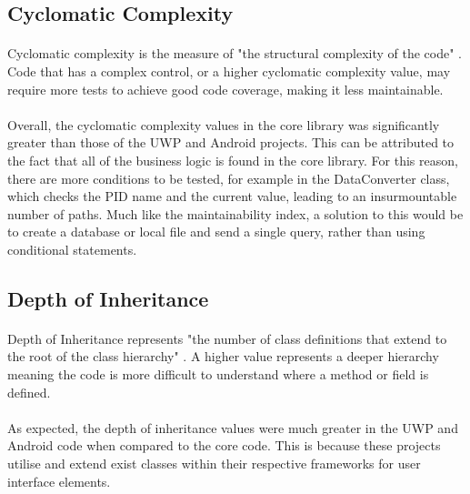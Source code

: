 {	\subsection*{Cyclomatic Complexity}
		\paragraph{}{
		Cyclomatic complexity is the measure of "the structural complexity of the code" \cite{CodeMetrics}. Code that has a complex control, or a higher cyclomatic complexity value, may require more tests to achieve good code coverage, making it less maintainable.
		}
		\paragraph{}{
		Overall, the cyclomatic complexity values in the core library was significantly greater than those of the UWP and Android projects. This can be attributed to the fact that all of the business logic is found in the core library. For this reason, there are more conditions to be tested, for example in the DataConverter class, which checks the PID name and the current value, leading to an insurmountable number of paths. Much like the maintainability index, a solution to this would be to create a database or local file and send a single query, rather than using conditional statements.
		}
	
	\subsection*{Depth of Inheritance}{
		\paragraph{}{
		Depth of Inheritance represents "the number of class definitions that extend to the root of the class hierarchy" \cite{CodeMetrics}. A higher value represents a deeper hierarchy meaning the code is more difficult to understand where a method or field is defined.
		}
		\paragraph{}{
		As expected, the depth of inheritance values were much greater in the UWP and Android code when compared to the core code. This is because these projects utilise and extend exist classes within their respective frameworks for user interface elements.
		}
		

}}
